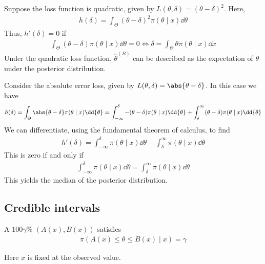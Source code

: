 \begin{example}
	Suppose the loss function is quadratic, given by $L(\theta, \delta) = (\theta-\delta)^2$.
	Here,
	\begin{align*}
		h(\delta) = \int_\Theta (\theta - \delta)^2 \pi(\theta \mid x) \dd{\theta}
	\end{align*}
	Thus, $h'(\delta) = 0$ if
	\begin{align*}
		\int_\Theta (\theta - \delta) \pi(\theta \mid x) \dd{\theta} = 0 \iff \delta = \int_\Theta \theta \pi(\theta \mid x) \dd{x}
	\end{align*}
	Under the quadratic loss function, $\hat \theta^{(B)}$ can be described as the expectation of $\theta$ under the posterior distribution.
\end{example}

\begin{example}
	Consider the absolute error loss, given by $L(\theta, \delta) = \abs{\theta - \delta}$.
	In this case we have
	\begin{align*}
		h(\delta) = \int_\Theta \abs{\theta - \delta} \pi(\theta \mid x) \dd{\theta} = \int_{-\infty}^\delta -(\theta-\delta)\pi(\theta \mid x)\dd{\theta} + \int_\delta^\infty (\theta-\delta)\pi(\theta \mid x)\dd{\theta}
	\end{align*}
	We can differentiate, using the fundamental theorem of calculus, to find
	\begin{align*}
		h'(\delta) = \int_{-\infty}^\delta \pi(\theta\mid x) \dd{\theta} - \int_\delta^\infty \pi(\theta \mid x)\dd{\theta}
	\end{align*}
	This is zero if and only if
	\begin{align*}
		\int_{-\infty}^\delta \pi(\theta\mid x) \dd{\theta} = \int_\delta^{\infty} \pi(\theta \mid x) \dd{\theta}
	\end{align*}
	This yields the median of the posterior distribution.
\end{example}

\subsection{Credible intervals}
\begin{definition}
	A $100\gamma$\%  $(A(x), B(x))$ satisfies
	\begin{align*}
		\pi(A(x) \leq \theta \leq B(x) \mid x) = \gamma
	\end{align*}
\end{definition}
Here $x$ is fixed at the observed value.

